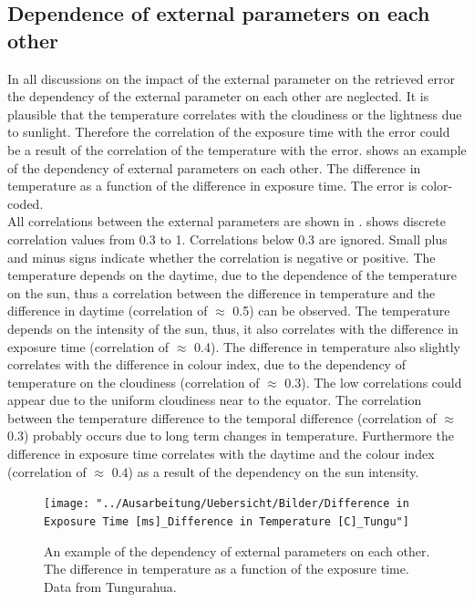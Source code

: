 \documentclass  [
  paper    = a4,
  BCOR     = 10mm,
  twoside,
  fontsize = 12pt,
  fleqn,
  toc      = bibnumbered,
  toc      = listofnumbered,
  numbers  = noendperiod,
  headings = normal,
  listof   = leveldown,
  version  = 3.03
]                                       {scrreprt}
\begin{document}
	\subsection*{Dependence of external parameters on each other}
	In all discussions on the impact of the external parameter on the retrieved   error the  dependency of the external parameter on each other are neglected. It is plausible that the temperature correlates with the cloudiness or the lightness due to sunlight. Therefore the correlation of the exposure time with the   error could be a result of the correlation of the temperature with the   error.  shows an example of the dependency of external parameters on each other. The difference in temperature as a function of the difference in exposure time. The   error is color-coded. \\
	All correlations between the external parameters are shown in .  shows discrete correlation values from 0.3 to 1. Correlations below 0.3 are ignored. Small plus and minus signs indicate whether the correlation is negative or positive. 
	The temperature depends on the daytime, due to the dependence of the temperature on the sun, thus a correlation between the  difference in temperature and the difference in daytime (correlation of $\approx$ 0.5) can be observed. The temperature depends on the intensity of the sun, thus, it also correlates with  the difference in exposure time (correlation of $\approx$ 0.4). The difference in temperature also slightly correlates with the difference in colour index, due to the dependency of temperature on the cloudiness (correlation of $\approx$ 0.3). The low correlations could appear due to the uniform cloudiness near to the equator. The correlation between the temperature difference to the temporal difference (correlation of $\approx$ 0.3) probably occurs due to long term changes in temperature. Furthermore the difference in exposure time correlates with the daytime and the colour index (correlation of $\approx$ 0.4) as a result of the dependency on the sun intensity.\\
	\begin{figure}[h]
		\centering
		\texttt{[image: "../Ausarbeitung/Uebersicht/Bilder/Difference in Exposure Time [ms]\_Difference in Temperature [C]\_Tungu"]}
		\caption{An example of the dependency of external parameters on each other. The difference in temperature as a function of the exposure time. Data from Tungurahua.}
		\label{fig:difference-in-exposure-time-msdifference-in-temperature-ctungu}
	\end{figure}
\end{document}
